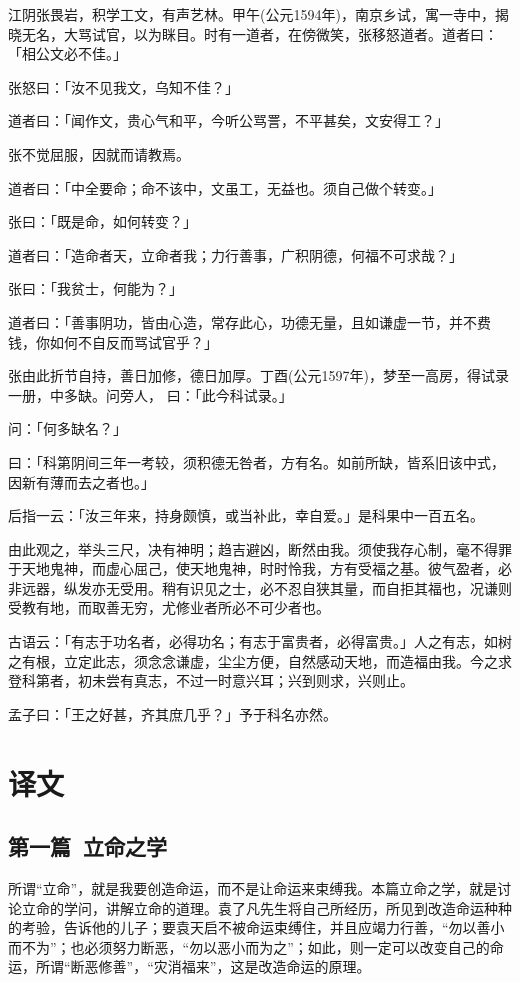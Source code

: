 \documentclass[12pt,twoside,openany]{book}
\begin{document}
江阴张畏岩，积学工文，有声艺林。甲午(公元1594年)，南京乡试，寓一寺中，揭晓无名，大骂试官，以为眯目。时有一道者，在傍微笑，张移怒道者。道者曰：「相公文必不佳。」

张怒曰：「汝不见我文，乌知不佳？」

道者曰：「闻作文，贵心气和平，今听公骂詈，不平甚矣，文安得工？」

张不觉屈服，因就而请教焉。

道者曰：「中全要命；命不该中，文虽工，无益也。须自己做个转变。」

张曰：「既是命，如何转变？」

道者曰：「造命者天，立命者我；力行善事，广积阴德，何福不可求哉？」

张曰：「我贫士，何能为？」

道者曰：「善事阴功，皆由心造，常存此心，功德无量，且如谦虚一节，并不费钱，你如何不自反而骂试官乎？」

张由此折节自持，善日加修，德日加厚。丁酉(公元1597年)，梦至一高房，得试录一册，中多缺。问旁人， 曰：「此今科试录。」

问：「何多缺名？」

曰：「科第阴间三年一考较，须积德无咎者，方有名。如前所缺，皆系旧该中式，因新有薄而去之者也。」

后指一云：「汝三年来，持身颇慎，或当补此，幸自爱。」是科果中一百五名。

由此观之，举头三尺，决有神明；趋吉避凶，断然由我。须使我存心制，毫不得罪于天地鬼神，而虚心屈己，使天地鬼神，时时怜我，方有受福之基。彼气盈者，必非远器，纵发亦无受用。稍有识见之士，必不忍自狭其量，而自拒其福也，况谦则受教有地，而取善无穷，尤修业者所必不可少者也。

古语云：「有志于功名者，必得功名；有志于富贵者，必得富贵。」人之有志，如树之有根，立定此志，须念念谦虚，尘尘方便，自然感动天地，而造福由我。今之求登科第者，初未尝有真志，不过一时意兴耳；兴到则求，兴则止。

孟子曰：「王之好甚，齐其庶几乎？」予于科名亦然。

\part{译文}
\chapter{第一篇\ 立命之学}
所谓“立命”，就是我要创造命运，而不是让命运来束缚我。本篇立命之学，就是讨论立命的学问，讲解立命的道理。袁了凡先生将自己所经历，所见到改造命运种种的考验，告诉他的儿子；要袁天启不被命运束缚住，并且应竭力行善，“勿以善小而不为”；也必须努力断恶，“勿以恶小而为之”；如此，则一定可以改变自己的命运，所谓“断恶修善”，“灾消福来”，这是改造命运的原理。
\end{document}
